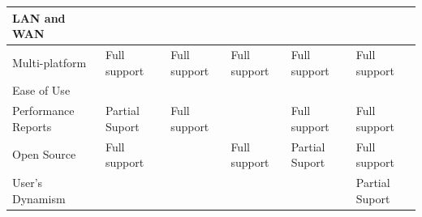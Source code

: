 \documentclass[espaco=umemeio,chapter=TITLE,twoside,openright]{abnt}
\begin{document}
\begin{table}[]
\begin{tabular}{|l|l|l|l|l|l|}
\cellcolor[HTML]{EFEFEF}LAN and WAN                   &                   &                  &                &                        &                \\ \hline
\cellcolor[HTML]{EFEFEF}Multi-platform                & Full support      & Full support     & Full support   & Full support           & Full support   \\ \hline
\cellcolor[HTML]{EFEFEF}Ease of Use                   &                   &                  &                &                        &                \\ \hline
\cellcolor[HTML]{EFEFEF}\begin{minipage}{0.2\textwidth}Performance Reports\end{minipage}           & Partial Suport    & Full support     &                & Full support           & Full support   \\ \hline
\cellcolor[HTML]{EFEFEF}Open Source                   & Full support      &                  & Full support   & Partial Suport         & Full support   \\ \hline
\cellcolor[HTML]{EFEFEF}User’s Dynamism               &                   &                  &                &                        & Partial Suport \\ \hline
\end{tabular}
\end{table}
\end{document}
